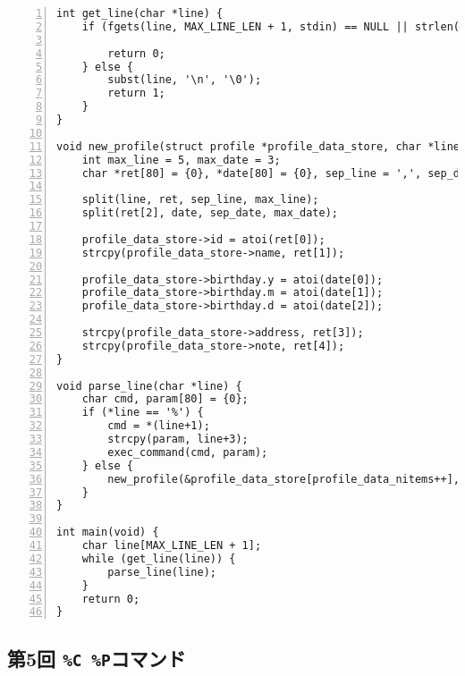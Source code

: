 \documentclass[autodetect-engine,dvi=dvipdfmx,ja=standard,
               a4j,11pt]{bxjsarticle}
\begin{document}
\begin{Verbatim}[numbers=left, xleftmargin=10mm, numbersep=6pt,
    fontsize=\small, baselinestretch=0.8]
int get_line(char *line) {
    if (fgets(line, MAX_LINE_LEN + 1, stdin) == NULL || strlen(line) > MAX_LINE_LEN ||
                                                                        *line == '\n') {
        return 0;
    } else {
        subst(line, '\n', '\0');
        return 1;
    }
}

void new_profile(struct profile *profile_data_store, char *line) {
    int max_line = 5, max_date = 3;
    char *ret[80] = {0}, *date[80] = {0}, sep_line = ',', sep_date = '-';

    split(line, ret, sep_line, max_line);
    split(ret[2], date, sep_date, max_date);

    profile_data_store->id = atoi(ret[0]);
    strcpy(profile_data_store->name, ret[1]);

    profile_data_store->birthday.y = atoi(date[0]);
    profile_data_store->birthday.m = atoi(date[1]);
    profile_data_store->birthday.d = atoi(date[2]);

    strcpy(profile_data_store->address, ret[3]);
    strcpy(profile_data_store->note, ret[4]);
}

void parse_line(char *line) {
    char cmd, param[80] = {0};
    if (*line == '%') {
        cmd = *(line+1);
        strcpy(param, line+3);
        exec_command(cmd, param);
    } else {
        new_profile(&profile_data_store[profile_data_nitems++], line);
    }
}

int main(void) {
    char line[MAX_LINE_LEN + 1];
    while (get_line(line)) {
        parse_line(line);
    }
    return 0;
}

\end{Verbatim}

\subsection{第5回 \texttt{\%C \%P}コマンド} \label{code:5}
\end{document}
